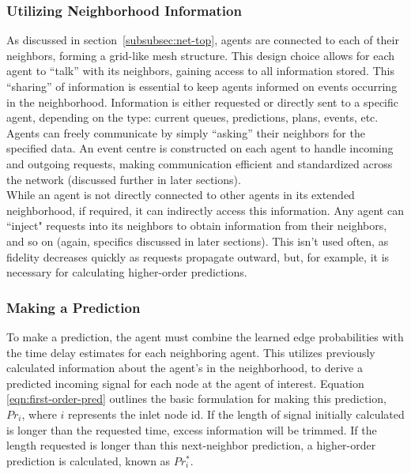 \documentclass{report}
\begin{document}
\subsubsection{Utilizing Neighborhood Information}
As discussed in section~\ref{subsubsec:net-top}, agents are connected to each of their neighbors, forming a grid-like mesh structure. 
This design choice allows for each agent to ``talk” with its neighbors, gaining access to all information stored. 
This ``sharing” of information is essential to keep agents informed on events occurring in the neighborhood.
Information is either requested or directly sent to a specific agent, depending on the type: current queues, predictions, plans, events, etc.
 Agents can freely communicate by simply ``asking” their neighbors for the specified data. 
An event centre is constructed on each agent to handle incoming and outgoing requests, making communication efficient and standardized across the network (discussed further in later sections). \\

	While an agent is not directly connected to other agents in its extended neighborhood, if required, it can indirectly access this information. 
Any agent can ``inject" requests into its neighbors to obtain information from their neighbors, and so on (again, specifics discussed in later sections). 
This isn’t used often, as fidelity decreases quickly as requests propagate outward, but, for example, it is necessary for calculating higher-order predictions. \\


\subsubsection{Making a Prediction}
To make a prediction, the agent must combine the learned edge probabilities with the time delay estimates for each neighboring agent. 
This utilizes previously calculated information about the agent’s in the neighborhood, to derive a predicted incoming signal for each node at the agent of interest. 
Equation \ref{eqn:first-order-pred} outlines the basic formulation for making this prediction, $Pr_{i}$, where $i$ represents the inlet node id. 
If the length of signal initially calculated is longer than the requested time, excess information will be trimmed. 
If the length requested is longer than this next-neighbor prediction, a higher-order prediction is calculated, known as $Pr_{i}^{*}$.\\
\end{document}
